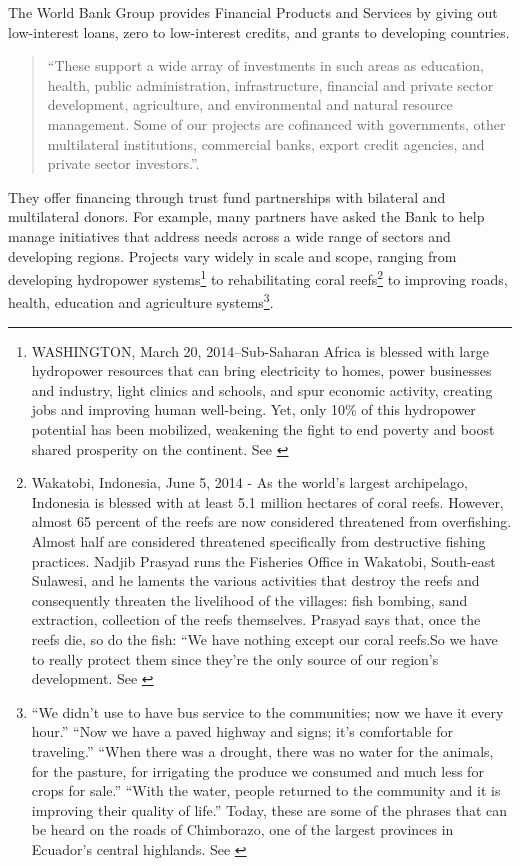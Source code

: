The World Bank Group provides Financial Products and Services by giving out low-interest loans, zero to low-interest credits, and grants to developing countries.
\begin{quote} ``These support a wide array of investments in such areas as education, health, public administration, infrastructure, financial and private sector development, agriculture, and environmental and natural resource management. Some of our projects are cofinanced with governments, other multilateral institutions, commercial banks, export credit agencies, and private sector investors.''\parencite{wb_about}. \end{quote}They offer financing through trust fund partnerships with bilateral and multilateral donors. For example, many partners have asked the Bank to help manage initiatives that address needs across a wide range of sectors and developing regions. Projects vary widely in scale and scope, ranging from developing hydropower systems\footnote{ WASHINGTON, March 20, 2014–Sub-Saharan Africa is blessed with large hydropower resources that can bring electricity to homes, power businesses and industry, light clinics and schools, and spur economic activity, creating jobs and improving human well-being.  Yet, only 10\% of this hydropower potential has been mobilized, weakening the fight to end poverty and boost shared prosperity on the continent. See \cite{wb_hydro}} to rehabilitating coral reefs\footnote{ Wakatobi, Indonesia, June 5, 2014 - As the world's largest archipelago, Indonesia is blessed with at least 5.1 million hectares of coral reefs. However, almost 65 percent of the reefs are now considered threatened from overfishing. Almost half are considered threatened specifically from destructive fishing practices. Nadjib Prasyad runs the Fisheries Office in Wakatobi, South-east Sulawesi, and he laments the various activities that destroy the reefs and consequently threaten the livelihood of the villages: fish bombing, sand extraction, collection of the reefs themselves. Prasyad says that, once the reefs die, so do the fish: “We have nothing except our coral reefs.So we have to really protect them since they're the only source of our region's development. See \cite{wb_coral}} to improving roads, health, education and agriculture systems\footnote{ ``We didn't use to have bus service to the communities; now we have it every hour.'' ``Now we have a paved highway and signs; it's comfortable for traveling.'' ``When there was a drought, there was no water for the animals, for the pasture, for irrigating the produce we consumed and much less for crops for sale.'' ``With the water, people returned to the community and it is improving their quality of life.'' Today, these are some of the phrases that can be heard on the roads of Chimborazo, one of the largest provinces in Ecuador’s central highlands. See \cite{wb_roads} }.

